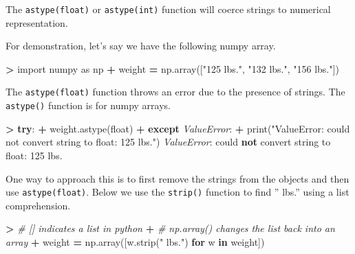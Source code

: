\documentclass[
]{book}
\newenvironment{Shaded}{\begin{snugshade}}{\end{snugshade}}
\newcommand{\BuiltInTok}[1]{#1}
\newcommand{\CommentTok}[1]{\textcolor[rgb]{0.56,0.35,0.01}{\textit{#1}}}
\newcommand{\ControlFlowTok}[1]{\textcolor[rgb]{0.13,0.29,0.53}{\textbf{#1}}}
\newcommand{\ImportTok}[1]{#1}
\newcommand{\KeywordTok}[1]{\textcolor[rgb]{0.13,0.29,0.53}{\textbf{#1}}}
\newcommand{\NormalTok}[1]{#1}
\newcommand{\OperatorTok}[1]{\textcolor[rgb]{0.81,0.36,0.00}{\textbf{#1}}}
\newcommand{\PreprocessorTok}[1]{\textcolor[rgb]{0.56,0.35,0.01}{\textit{#1}}}
\newcommand{\StringTok}[1]{\textcolor[rgb]{0.31,0.60,0.02}{#1}}
\begin{document}
The \texttt{astype(float)} or \texttt{astype(int)} function will coerce strings to numerical representation.

For demonstration, let's say we have the following numpy array.

\begin{Shaded}
\begin{Highlighting}[]
\OperatorTok{\textgreater{}} \ImportTok{import}\NormalTok{ numpy }\ImportTok{as}\NormalTok{ np}
\OperatorTok{+}\NormalTok{ weight }\OperatorTok{=}\NormalTok{ np.array([}\StringTok{"125 lbs."}\NormalTok{, }\StringTok{"132 lbs."}\NormalTok{, }\StringTok{"156 lbs."}\NormalTok{])}
\end{Highlighting}
\end{Shaded}

The \texttt{astype(float)} function throws an error due to the presence of strings. The \texttt{astype()} function is for numpy arrays.

\begin{Shaded}
\begin{Highlighting}[]
\OperatorTok{\textgreater{}} \ControlFlowTok{try}\NormalTok{:}
\OperatorTok{+}\NormalTok{   weight.astype(}\BuiltInTok{float}\NormalTok{)}
\OperatorTok{+} \ControlFlowTok{except} \PreprocessorTok{ValueError}\NormalTok{:}
\OperatorTok{+}   \BuiltInTok{print}\NormalTok{(}\StringTok{"ValueError: could not convert string to float: \textquotesingle{}125 lbs.\textquotesingle{}"}\NormalTok{)}
\PreprocessorTok{ValueError}\NormalTok{: could }\KeywordTok{not}\NormalTok{ convert string to }\BuiltInTok{float}\NormalTok{: }\StringTok{\textquotesingle{}125 lbs.\textquotesingle{}}
\end{Highlighting}
\end{Shaded}

One way to approach this is to first remove the strings from the objects and then use \texttt{astype(float)}. Below we use the \texttt{strip()} function to find '' lbs.'' using a list comprehension.

\begin{Shaded}
\begin{Highlighting}[]
\OperatorTok{\textgreater{}} \CommentTok{\# [] indicates a list in python}
\OperatorTok{+} \CommentTok{\# np.array() changes the list back into an array}
\OperatorTok{+}\NormalTok{ weight }\OperatorTok{=}\NormalTok{ np.array([w.strip(}\StringTok{" lbs."}\NormalTok{) }\ControlFlowTok{for}\NormalTok{ w }\KeywordTok{in}\NormalTok{ weight])}
\end{Highlighting}
\end{Shaded}
\end{document}

